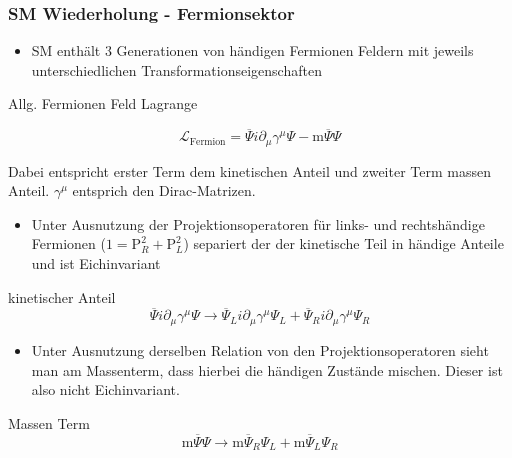 \documentclass{beamer}
\begin{document}
\begin{frame}
\frametitle{SM Wiederholung - Fermionsektor}
\begin{itemize}
\item SM enthält 3 Generationen von händigen Fermionen Feldern mit jeweils unterschiedlichen Transformationseigenschaften 
\end{itemize}
\begin{block}{Allg. Fermionen Feld Lagrange}

\begin{equation}
\mathscr{L}_{\text{Fermion}}=\overline{\Psi} i \partial_{\mu} \gamma^{\mu} \Psi -\text{m}\overline{\Psi} \Psi 
\end{equation}
\end{block}
Dabei entspricht erster Term dem kinetischen Anteil und zweiter Term massen Anteil.  $\gamma^{\mu}$ entsprich den Dirac-Matrizen.
\end{frame}
\begin{frame}
\begin{itemize}
\item Unter Ausnutzung der Projektionsoperatoren für links- und rechtshändige Fermionen ($1=\text{P}_{R}^{2}+ \text{P}_{L}^{2}$) separiert der der kinetische Teil in händige Anteile und ist Eichinvariant 

\end{itemize}
\begin{block}{kinetischer Anteil}
\begin{equation}
\overline{\Psi} i \partial_{\mu} \gamma^{\mu} \Psi  \rightarrow \overline{\Psi}_{L} i \partial_{\mu} \gamma^{\mu} \Psi_{L} +\overline{\Psi}_{R} i \partial_{\mu} \gamma^{\mu} \Psi_{R} 
\end{equation}
\end{block}

\begin{itemize}
\item Unter Ausnutzung derselben Relation von den Projektionsoperatoren sieht man am Massenterm, dass hierbei die händigen Zustände mischen. Dieser ist also nicht Eichinvariant.
\end{itemize}

\begin{block}{Massen Term}
\begin{equation}
\text{m}\overline{\Psi} \Psi  \rightarrow \text{m}\overline{\Psi}_{R} \Psi_{L} +\text{m}\overline{\Psi}_{L} \Psi_{R} 
\end{equation}
\end{block}
\end{frame}
\end{document}
